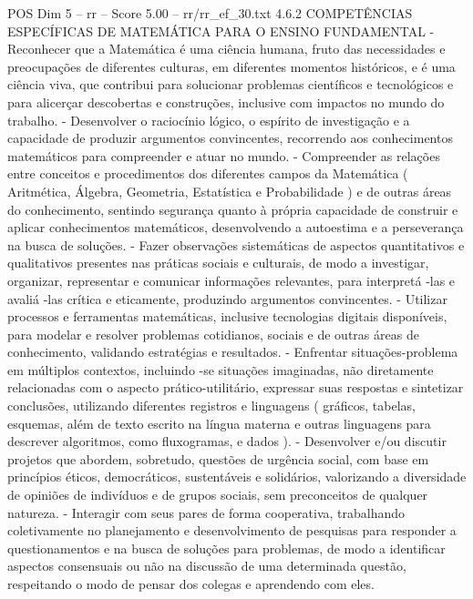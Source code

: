 \begin{textsample}{POS Dim 5 – rr – Score 5.00 – rr/rr\_ef\_30.txt}  \label{ex:f5_pos_222}
4.6.2 COMPETÊNCIAS ESPECÍFICAS DE MATEMÁTICA PARA O ENSINO FUNDAMENTAL - Reconhecer que a Matemática é uma ciência humana, fruto das necessidades e preocupações de diferentes culturas, em diferentes momentos históricos, e é uma ciência viva, que contribui para solucionar problemas científicos e tecnológicos e para alicerçar descobertas e construções, inclusive com impactos no mundo do trabalho. - Desenvolver o raciocínio lógico, o espírito de investigação e a capacidade de produzir argumentos convincentes, recorrendo aos conhecimentos matemáticos para compreender e atuar no mundo. - Compreender as relações entre conceitos e procedimentos dos diferentes campos da Matemática ( Aritmética, Álgebra, Geometria, Estatística e Probabilidade ) e de outras áreas do conhecimento, sentindo segurança quanto à própria capacidade de construir e aplicar conhecimentos matemáticos, desenvolvendo a autoestima e a perseverança na busca de soluções. - Fazer observações sistemáticas de aspectos quantitativos e qualitativos presentes nas práticas sociais e culturais, de modo a investigar, organizar, representar e comunicar informações relevantes, para interpretá -las e avaliá -las crítica e eticamente, produzindo argumentos convincentes. - Utilizar processos e ferramentas matemáticas, inclusive tecnologias digitais disponíveis, para modelar e resolver problemas cotidianos, sociais e de outras áreas de conhecimento, validando estratégias e resultados. - Enfrentar situações-problema em múltiplos contextos, incluindo -se situações imaginadas, não diretamente relacionadas com o aspecto prático-utilitário, expressar suas respostas e sintetizar conclusões, utilizando diferentes registros e linguagens ( gráficos, tabelas, esquemas, além de texto escrito na língua materna e outras linguagens para descrever algoritmos, como fluxogramas, e dados ). - Desenvolver e/ou discutir projetos que abordem, sobretudo, questões de urgência social, com base em princípios éticos, democráticos, sustentáveis e solidários, valorizando a diversidade de opiniões de indivíduos e de grupos sociais, sem preconceitos de qualquer natureza. - Interagir com seus pares de forma cooperativa, trabalhando coletivamente no planejamento e desenvolvimento de pesquisas para responder a questionamentos e na busca de soluções para problemas, de modo a identificar aspectos consensuais ou não na discussão de uma determinada questão, respeitando o modo de pensar dos colegas e aprendendo com eles.

\end{textsample}
